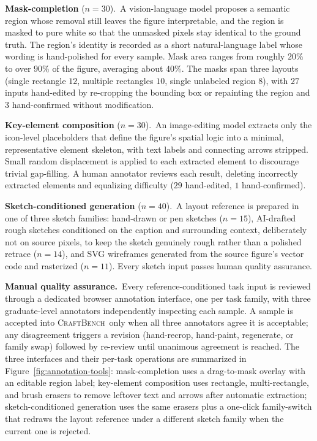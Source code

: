 \documentclass{llmxive}
\providecommand{\CrafterBench}{\textsc{CraftBench}\xspace}
\begin{document}
\noindent\textbf{Mask-completion} ($n{=}30$).\
A vision-language model proposes a semantic region whose removal still leaves the figure interpretable, and the region is masked to pure white so that the unmasked pixels stay identical to the ground truth. The region's identity is recorded as a short natural-language label whose wording is hand-polished for every sample. Mask area ranges from roughly $20\%$ to over $90\%$ of the figure, averaging about $40\%$. The masks span three layouts (single rectangle $12$, multiple rectangles $10$, single unlabeled region $8$), with $27$ inputs hand-edited by re-cropping the bounding box or repainting the region and $3$ hand-confirmed without modification.

\noindent\textbf{Key-element composition} ($n{=}30$).\
An image-editing model extracts only the icon-level placeholders that define the figure's spatial logic into a minimal, representative element skeleton, with text labels and connecting arrows stripped. Small random displacement is applied to each extracted element to discourage trivial gap-filling. A human annotator reviews each result, deleting incorrectly extracted elements and equalizing difficulty ($29$ hand-edited, $1$ hand-confirmed).

\noindent\textbf{Sketch-conditioned generation} ($n{=}40$).\
A layout reference is prepared in one of three sketch families: hand-drawn or pen sketches ($n{=}15$), AI-drafted rough sketches conditioned on the caption and surrounding context, deliberately not on source pixels, to keep the sketch genuinely rough rather than a polished retrace ($n{=}14$), and SVG wireframes generated from the source figure's vector code and rasterized ($n{=}11$). Every sketch input passes human quality assurance.

\noindent\textbf{Manual quality assurance.}\
Every reference-conditioned task input is reviewed through a dedicated browser annotation interface, one per task family, with three graduate-level annotators independently inspecting each sample. A sample is accepted into \CrafterBench\ only when all three annotators agree it is acceptable; any disagreement triggers a revision (hand-recrop, hand-paint, regenerate, or family swap) followed by re-review until unanimous agreement is reached. The three interfaces and their per-task operations are summarized in Figure~\ref{fig:annotation-tools}: mask-completion uses a drag-to-mask overlay with an editable region label; key-element composition uses rectangle, multi-rectangle, and brush erasers to remove leftover text and arrows after automatic extraction; sketch-conditioned generation uses the same erasers plus a one-click family-switch that redraws the layout reference under a different sketch family when the current one is rejected.
\end{document}

